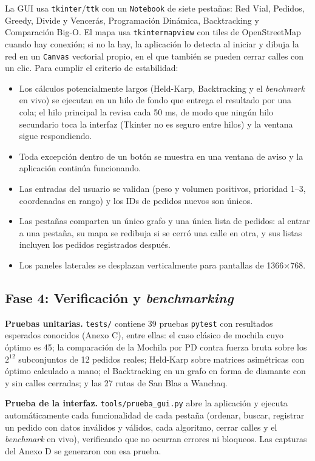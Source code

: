 La GUI usa \texttt{tkinter}/\texttt{ttk} con un \texttt{Notebook} de siete pestañas: Red Vial, Pedidos, Greedy, Divide y Vencerás, Programación Dinámica, Backtracking y Comparación Big-O. El mapa usa \texttt{tkintermapview} con tiles de OpenStreetMap cuando hay conexión; si no la hay, la aplicación lo detecta al iniciar y dibuja la red en un \texttt{Canvas} vectorial propio, en el que también se pueden cerrar calles con un clic. Para cumplir el criterio de estabilidad:
\begin{itemize}
    \item Los cálculos potencialmente largos (Held-Karp, Backtracking y el \textit{benchmark} en vivo) se ejecutan en un hilo de fondo que entrega el resultado por una cola; el hilo principal la revisa cada 50 ms, de modo que ningún hilo secundario toca la interfaz (Tkinter no es seguro entre hilos) y la ventana sigue respondiendo.
    \item Toda excepción dentro de un botón se muestra en una ventana de aviso y la aplicación continúa funcionando.
    \item Las entradas del usuario se validan (peso y volumen positivos, prioridad 1--3, coordenadas en rango) y los IDs de pedidos nuevos son únicos.
    \item Las pestañas comparten un único grafo y una única lista de pedidos: al entrar a una pestaña, su mapa se redibuja si se cerró una calle en otra, y sus listas incluyen los pedidos registrados después.
    \item Los paneles laterales se desplazan verticalmente para pantallas de 1366$\times$768.
\end{itemize}

\subsection{Fase 4: Verificación y \textit{benchmarking}}

\textbf{Pruebas unitarias.} \texttt{tests/} contiene 39 pruebas \texttt{pytest} con resultados esperados conocidos (Anexo C), entre ellas: el caso clásico de mochila cuyo óptimo es 45; la comparación de la Mochila por PD contra fuerza bruta sobre los $2^{12}$ subconjuntos de 12 pedidos reales; Held-Karp sobre matrices asimétricas con óptimo calculado a mano; el Backtracking en un grafo en forma de diamante con y sin calles cerradas; y las 27 rutas de San Blas a Wanchaq.

\textbf{Prueba de la interfaz.} \texttt{tools/prueba\_gui.py} abre la aplicación y ejecuta automáticamente cada funcionalidad de cada pestaña (ordenar, buscar, registrar un pedido con datos inválidos y válidos, cada algoritmo, cerrar calles y el \textit{benchmark} en vivo), verificando que no ocurran errores ni bloqueos. Las capturas del Anexo D se generaron con esa prueba.

